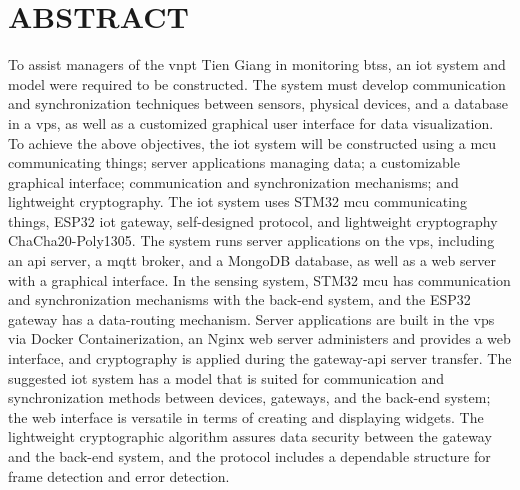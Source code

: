 \chapter*{ABSTRACT}
\label{Abstract-EN}

To assist managers of the \acrfull{vnpt} Tien Giang in monitoring \glspl{bts}, an \acrfull{iot} system and model were required to be constructed. The system must develop communication and synchronization techniques between sensors, physical devices, and a database in a \acrfull{vps}, as well as a customized graphical user interface for data visualization.
To achieve the above objectives, the \acrshort{iot} system will be constructed using a \acrfull{mcu} communicating things; server applications managing data; a customizable graphical interface; communication and synchronization mechanisms; and lightweight cryptography.
The \acrshort{iot} system uses STM32 \acrshort{mcu} communicating things, ESP32 \acrshort{iot} gateway, self-designed protocol, and lightweight cryptography ChaCha20-Poly1305. The system runs server applications on the \acrshort{vps}, including an \acrshort{api} server, a \acrfull{mqtt} broker, and a MongoDB database, as well as a web server with a graphical interface.
In the sensing system, STM32 \acrshort{mcu} has communication and synchronization mechanisms with the back-end system, and the ESP32 gateway has a data-routing mechanism. Server applications are built in the \acrshort{vps} via Docker Containerization, an Nginx web server administers and provides a web interface, and cryptography is applied during the gateway-\acrshort{api} server transfer.
The suggested \acrshort{iot} system has a model that is suited for communication and synchronization methods between devices, gateways, and the back-end system; the web interface is versatile in terms of creating and displaying widgets. The lightweight cryptographic algorithm assures data security between the gateway and the back-end system, and the protocol includes a dependable structure for frame detection and error detection.
